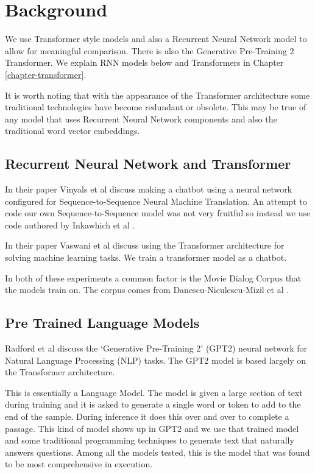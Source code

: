 \section{Background}
We use Transformer style models and also a Recurrent Neural Network model to allow for meaningful comparison. There is also the Generative Pre-Training 2 Transformer. We explain RNN models below and Transformers in Chapter \ref{chapter-transformer}.

It is worth noting that with the appearance of the Transformer architecture some traditional technologies have become redundant or obsolete. This may be true of any model that uses Recurrent Neural Network components and also the traditional word vector embeddings.

\subsection{Recurrent Neural Network and Transformer}

In their paper Vinyals et al \cite{DBLP:journals/corr/VinyalsL15} discuss making a chatbot using a neural network configured for Sequence-to-Sequence Neural Machine Translation. An attempt to code our own Sequence-to-Sequence model was not very fruitful so instead we use code authored by Inkawhich et al \cite{2018Inkawhich}.

In their paper Vaswani et al \cite{Vaswani2017AttentionIA} discuss using the Transformer architecture for solving machine learning tasks. We train a transformer model as a chatbot.

In both of these experiments a common factor is the Movie Dialog Corpus that the models train on. The corpus comes from Danescu-Niculescu-Mizil et al \cite{Danescu-Niculescu-Mizil+Lee:11a}.

\subsection{Pre Trained Language Models}
Radford et al \cite{radford2019language} discuss the `Generative Pre-Training 2' (GPT2) neural network for Natural Language Processing (\ac{NLP}) tasks. The GPT2 model is based largely on the Transformer architecture. 

This is essentially a Language Model. The model is given a large section of text during training and it is asked to generate a single word or token to add to the end of the sample. During inference it does this over and over to complete a passage. This kind of model shows up in GPT2 and we use that trained model and some traditional programming techniques to generate text that naturally answers questions. Among all the models tested, this is the model that was found to be most comprehensive in execution.

